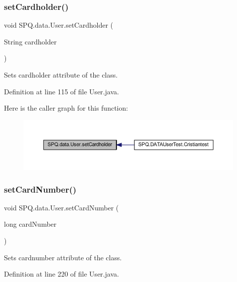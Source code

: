 \subsubsection{\texorpdfstring{set\+Cardholder()}{setCardholder()}}
{\footnotesize\ttfamily void S\+P\+Q.\+data.\+User.\+set\+Cardholder (\begin{DoxyParamCaption}\item[{String}]{cardholder }\end{DoxyParamCaption})}

Sets cardholder attribute of the class. 

Definition at line 115 of file User.\+java.

Here is the caller graph for this function\+:\nopagebreak
\begin{figure}[H]
\begin{center}
\leavevmode
\includegraphics[width=350pt]{class_s_p_q_1_1data_1_1_user_a0fe49415c82bbbbfa0b22822f054157f_icgraph}
\end{center}
\end{figure}
\mbox{\label{class_s_p_q_1_1data_1_1_user_a6d98a72cb61e95f5417e10e0ba80afab}} 
\subsubsection{\texorpdfstring{set\+Card\+Number()}{setCardNumber()}}
{\footnotesize\ttfamily void S\+P\+Q.\+data.\+User.\+set\+Card\+Number (\begin{DoxyParamCaption}\item[{long}]{card\+Number }\end{DoxyParamCaption})}

Sets cardnumber attribute of the class. 

Definition at line 220 of file User.\+java.

